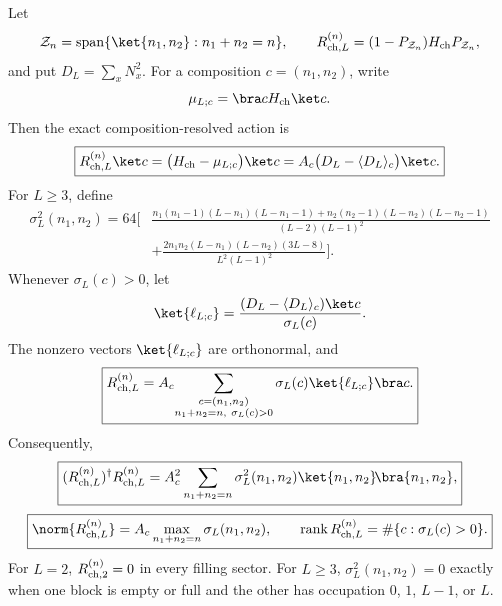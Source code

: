 %
%

\begin{proposition}
\label{prop:charge-leakage-periodic}
Let
\[
 \mathcal Z_n=\operatorname{span}\{\ket{n_1,n_2}:n_1+n_2=n\},
 \qquad
 R_{{\rm ch},L}^{(n)}=(1-P_{\mathcal Z_n})H_{\rm ch}P_{\mathcal Z_n},
\]
and put $D_L=\sum_x N_x^2$.  For a composition $c=(n_1,n_2)$, write
\[
 \mu_{L;c}=\bra cH_{\rm ch}\ket c.
\]
Then the exact composition-resolved action is
\begin{equation}
 \boxed{
 R_{{\rm ch},L}^{(n)}\ket c
 =\bigl(H_{\rm ch}-\mu_{L;c}\bigr)\ket c
 =A_c\bigl(D_L-\langle D_L\rangle_c\bigr)\ket c.}
 \label{eq:periodic-charge-leakage-action}
\end{equation}
For $L\ge3$, define
\begin{equation}
\boxed{
\begin{aligned}
\sigma_L^2(n_1,n_2)=64\Bigg[&
\frac{n_1(n_1-1)(L-n_1)(L-n_1-1)
+n_2(n_2-1)(L-n_2)(L-n_2-1)}{(L-2)(L-1)^2}\\
&+\frac{2n_1n_2(L-n_1)(L-n_2)(3L-8)}{L^2(L-1)^2}
\Bigg].
\end{aligned}}
\label{eq:periodic-charge-leakage-variance}
\end{equation}
Whenever $\sigma_L(c)>0$, let
\begin{equation}
 \ket{\ell_{L;c}}
 =\frac{(D_L-\langle D_L\rangle_c)\ket c}{\sigma_L(c)}.
 \label{eq:periodic-charge-left-singular-vector}
\end{equation}
The nonzero vectors $\ket{\ell_{L;c}}$ are orthonormal, and
\begin{equation}
 \boxed{
 R_{{\rm ch},L}^{(n)}
 =A_c\!\sum_{\substack{c=(n_1,n_2)\\n_1+n_2=n,\ \sigma_L(c)>0}}
 \sigma_L(c)\ket{\ell_{L;c}}\bra c.}
 \label{eq:periodic-charge-leakage-svd}
\end{equation}
Consequently,
\begin{equation}
 \boxed{
 (R_{{\rm ch},L}^{(n)})^\dagger R_{{\rm ch},L}^{(n)}
 =A_c^2\sum_{n_1+n_2=n}\sigma_L^2(n_1,n_2)
 \ket{n_1,n_2}\!\bra{n_1,n_2},}
 \label{eq:periodic-charge-leakage-gram}
\end{equation}
\begin{equation}
 \boxed{
 \norm{R_{{\rm ch},L}^{(n)}}
 =A_c\max_{n_1+n_2=n}\sigma_L(n_1,n_2),
 \qquad
 \operatorname{rank}R_{{\rm ch},L}^{(n)}
 =\#\{c:\sigma_L(c)>0\}.}
 \label{eq:periodic-charge-leakage-norm}
\end{equation}
For $L=2$, $R_{{\rm ch},2}^{(n)}=0$ in every filling sector.  For $L\ge3$,
$\sigma_L^2(n_1,n_2)=0$ exactly when one block is empty or full and the other
has occupation $0$, $1$, $L-1$, or $L$.
\end{proposition}

